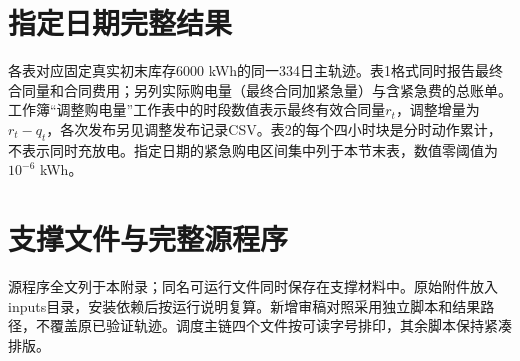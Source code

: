 \section{指定日期完整结果}
各表对应固定真实初末库存6000 kWh的同一334日主轨迹。表1格式同时报告最终合同量和合同费用；另列实际购电量（最终合同加紧急量）与含紧急费的总账单。工作簿“调整购电量”工作表中的时段数值表示最终有效合同量$r_t$，调整增量为$r_t-q_t$，各次发布另见调整发布记录CSV。表2的每个四小时块是分时动作累计，不表示同时充放电。指定日期的紧急购电区间集中列于本节末表，数值零阈值为$10^{-6}$ kWh。

\clearpage
\clearpage
\clearpage


\clearpage\section{支撑文件与完整源程序}
源程序全文列于本附录；同名可运行文件同时保存在支撑材料中。原始附件放入inputs目录，安装依赖后按运行说明复算。新增审稿对照采用独立脚本和结果路径，不覆盖原已验证轨迹。调度主链四个文件按可读字号排印，其余脚本保持紧凑排版。


